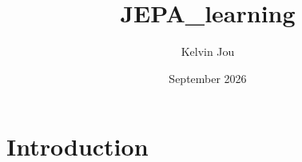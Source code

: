 \documentclass{article}
\title{JEPA_learning}
\author{Kelvin Jou}
\date{September 2026}
\begin{document}
\maketitle

\section{Introduction}
\end{document}
